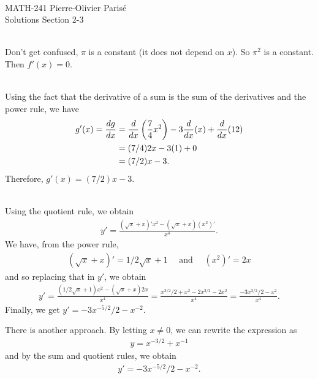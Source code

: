 


	\noindent \hrulefill \\
	MATH-241 \hfill Pierre-Olivier Paris{\'e}\\
	Solutions Section 2-3 \hfill \semester \\\vspace*{-1cm}
	
	\noindent\hrulefill
	
	\spc
	
	\\
	Don't get confused, $\pi$ is a constant (it does not depend on $x$). So $\pi^2$ is a constant. Then $f'(x) = 0$.
	
	\spc
	
	\\
	Using the fact that the derivative of a sum is the sum of the derivatives and the power rule, we have
		\begin{align*}
		g'(x) = \frac{dg}{dx} &= \frac{d}{dx} \left( \frac{7}{4} x^2 \right) - 3 \frac{d}{dx} (x) + \frac{d}{dx}(12) \\
		&= (7/4) 2 x - 3 (1) + 0 \\
		&= (7/2)x - 3 .
		\end{align*}
	Therefore, $g'(x) = (7/2)x - 3$.
	
	\spc
	
	\\
	Using the quotient rule, we obtain
		\begin{align*}
		y' = \frac{(\sqrt{x} + x)' x^2 - (\sqrt{x} + x) (x^2)'}{x^4} .
		\end{align*}
	We have, from the power rule,
		\begin{align*}
		(\sqrt{x} + x)' = 1/2\sqrt{x} + 1 \quad \text{ and } \quad (x^2)' = 2x
		\end{align*}
	and so replacing that in $y'$, we obtain
		\begin{align*}
		y' = \frac{(1/2\sqrt{x} + 1) x^2 - (\sqrt{x} + x) 2x}{x^4} = \frac{x^{3/2}/2 + x^2 - 2x^{3/2} - 2x^2}{x^4} = \frac{-3x^{3/2}/2 - x^2}{x^4} .
		\end{align*}
	Finally, we get $y' = -3x^{-5/2}/2 - x^{-2}$.
	
	There is another approach. By letting $x \neq 0$, we can rewrite the expression as
		\begin{align*}
		y = x^{-3/2} + x^{-1}
		\end{align*}
	and by the sum and quotient rules, we obtain
		\begin{align*}
		y' = -3 x^{-5/2}/2 - x^{-2} .
		\end{align*}
	
